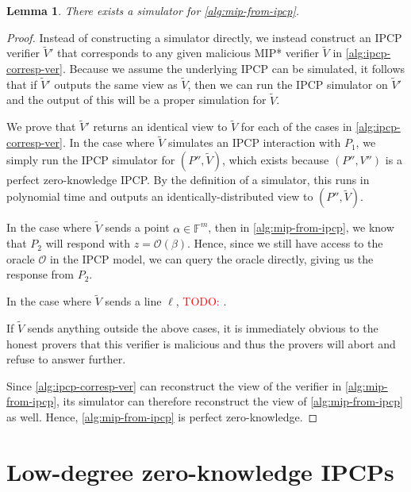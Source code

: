 \documentclass[english,12pt]{reedthesis}
\theoremstyle{plain}
\newtheorem{lemma}[lemma]{Lemma}
\theoremstyle{definition}
\theoremstyle{remark}
\newcommand{\TODO}[1]{\textcolor{red}{TODO: #1}}
\begin{document}
\begin{lemma}\label{lem:sim-mip-works}
  There exists a simulator for \cref{alg:mip-from-ipcp}.
\end{lemma}

\begin{proof}
  Instead of constructing a simulator directly, we instead construct an IPCP
  verifier $\tilde{V}'$ that corresponds to any given malicious MIP* verifier
  $\tilde{V}$ in \cref{alg:ipcp-corresp-ver}. Because we assume the underlying
  IPCP can be simulated, it follows that if $\tilde{V}'$ outputs the same view
  as $\tilde{V}$, then we can run the IPCP simulator on $\tilde{V}'$ and the
  output of this will be a proper simulation for $\tilde{V}$.

  We prove that $\tilde{V}'$ returns an identical view to $\tilde{V}$ for each
  of the cases in \cref{alg:ipcp-corresp-ver}. In the case where $\tilde{V}$
  simulates an IPCP interaction with $P_{1}$, we simply run the IPCP simulator
  for $(P'', \tilde{V})$, which exists because $(P'', V'')$ is a perfect
  zero-knowledge IPCP\@. By the definition of a simulator, this runs in
  polynomial time and outputs an identically-distributed view to
  $(P'', \tilde{V})$.

  In the case where $\tilde{V}$ sends a point $\alpha \in \mathbb{F}^{m}$, then in
  \cref{alg:mip-from-ipcp}, we know that $P_{2}$ will respond with $z = \mathcal{O}(\beta)$.
  Hence, since we still have access to the oracle $\mathcal{O}$ in the IPCP model, we can
  query the oracle directly, giving us the response from $P_{2}$.

  In the case where $\tilde{V}$ sends a line $\ell$, \TODO{}.

  If $\tilde{V}$ sends anything outside the above cases, it is immediately
  obvious to the honest provers that this verifier is malicious and thus the
  provers will abort and refuse to answer further.

  Since \cref{alg:ipcp-corresp-ver} can reconstruct the view of the verifier in
  \cref{alg:mip-from-ipcp}, its simulator can therefore reconstruct the view of
  \cref{alg:mip-from-ipcp} as well. Hence, \cref{alg:mip-from-ipcp} is perfect
  zero-knowledge.
\end{proof}

\chapter{Low-degree zero-knowledge IPCPs}\label{chap:ipcp-zero-knowledge}
\end{document}

